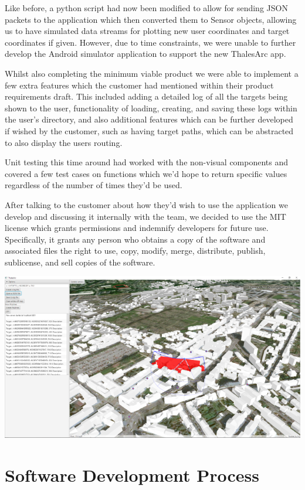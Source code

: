 \documentclass{l3proj}
\begin{document}
Like before, a python script had now been modified to allow for sending JSON packets to the application which then converted them to Sensor objects, allowing us to have simulated data streams for plotting new user coordinates and target coordinates if given. However, due to time constraints, we were unable to further develop the Android simulator application to support the new ThalesArc app.

Whilst also completing the minimum viable product we were able to implement a few extra features which the customer had mentioned within their product requirements draft. This included adding a detailed log of all the targets being shown to the user, functionality of loading, creating, and saving these logs within the user's directory, and also additional features which can be further developed if wished by the customer, such as having target paths, which can be abstracted to also display the users routing.

Unit testing this time around had worked with the non-visual components and covered a few test cases on functions which we'd hope to return specific values regardless of the number of times they'd be used.

After talking to the customer about how they'd wish to use the application we develop and discussing it internally with the team, we decided to use the MIT license which grants permissions and indemnify developers for future use. Specifically, it grants any person who obtains a copy of the software and associated files the right to use, copy, modify, merge, distribute, publish, sublicense, and sell copies of the software.

\includegraphics[width=\textwidth]{ThalesARC2}


\section{Software Development Process}
\end{document}
